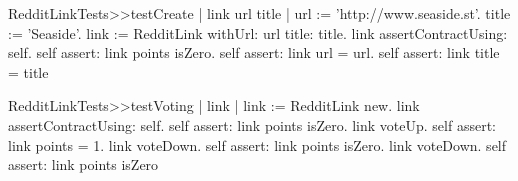 \documentclass[a4paper,10pt,twoside]{book}
\begin{document}
\begin{code}{}
RedditLinkTests>>testCreate
    | link url title | 
    url := 'http://www.seaside.st'. 
    title := 'Seaside'. 
    link := RedditLink withUrl: url title: title. 
    link assertContractUsing: self. 
    self assert: link points isZero. 
    self assert: link url = url. 
    self assert: link title = title
\end{code}

\begin{code}{}
RedditLinkTests>>testVoting
    | link | 
    link := RedditLink new. 
    link assertContractUsing: self. 
    self assert: link points isZero. link voteUp. 
    self assert: link points = 1. 
    link voteDown. self assert: 
    link points isZero. 
    link voteDown. 
    self assert: link points isZero
\end{code}


\section{}
\section{}

\section{}
\section{}
\section{}

\section{}
\section{}

\section{}


\ifx\wholebook\relax\else
    
    
\end{document}
